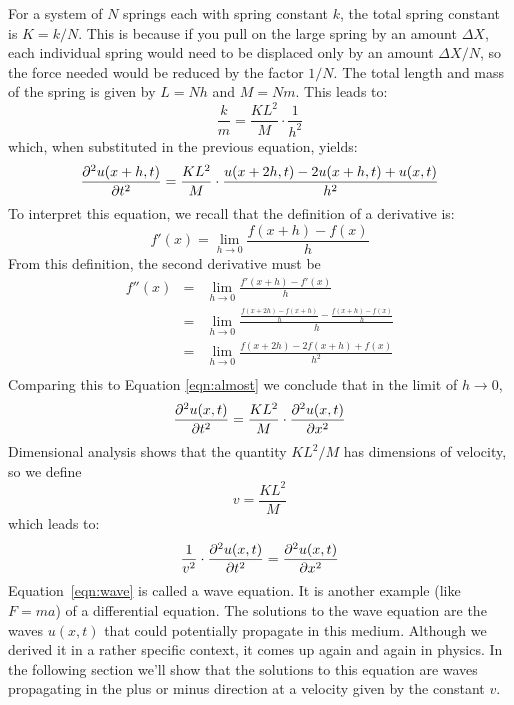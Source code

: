 \documentclass[12pt]{article}
\begin{document}
For a system of $N$ springs each with spring constant $k$, the total spring constant is $K = k/N$.  This is because if you pull on the large spring by an amount $\Delta X$, each individual spring would need to be displaced only by an amount $\Delta X / N$, so the force needed would be reduced by the factor $1/N$.  The total length and mass of the spring is given by $L = N h$ and $M = Nm$.  This leads to:
\begin{displaymath}
\frac{k}{m} = \frac{K L^2}{M} \cdot \frac{1}{h^2}
\end{displaymath}
which, when substituted in the previous equation, yields:
\begin{equation}\label{eqn:almost}
\frac{\partial^2 u(x+h,t)}{\partial t^2} = \frac{K L^2}{M} \cdot \frac{u(x+2h,t) - 2 u(x+h,t) + u(x,t)}{h^2}  
\end{equation}
To interpret this equation, we recall that the definition of a derivative is:
\begin{displaymath}
f'(x) = \lim_{h \to 0} \frac{f(x+h) - f(x)}{h} 
\end{displaymath}
From this definition, the second derivative must be
\begin{eqnarray*}
f''(x) & = & \lim_{h \to 0} \frac{f'(x+h) - f'(x)}{h} \\ 
& = & \lim_{h \to 0} \frac{\frac{f(x+2h) - f(x+h)}{h}-\frac{f(x+h) -f(x)}{h}}{h} \\
& = & \lim_{h \to 0} \frac{f(x+2h) - 2 f(x+h) + f(x)}{h^2} \\
\end{eqnarray*}
Comparing this to Equation \ref{eqn:almost} we conclude that in the limit of $h \to 0$, 
\begin{equation}
\frac{\partial^2 u(x,t)}{\partial t^2} = \frac{K L^2}{M} \cdot \frac{\partial^2 u(x,t)}{\partial x^2}
\end{equation}  
Dimensional analysis shows that the quantity $K L^2 / M$ has dimensions of velocity, so we define
\begin{equation}
v = \frac{K L^2}{M}
\end{equation}  
which leads to:
\begin{equation}\label{eqn:wave}
\frac{1}{v^2} \cdot \frac{\partial^2 u(x,t)}{\partial t^2} = \frac{\partial^2 u(x,t)}{\partial x^2} 
\end{equation}  
Equation~\ref{eqn:wave} is called a wave equation.  It is another example (like $F=ma$) of a differential equation.  The solutions to the wave equation are the waves $u(x,t)$ that could potentially propagate in this medium.  Although we derived it in a rather specific context, it comes up again and again in physics.  In the following section we'll show that the solutions to this equation are waves propagating in the plus or minus direction at a velocity given by the constant $v$.  
\end{document}
